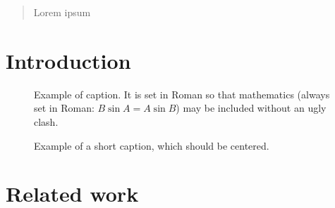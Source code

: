 \documentclass[10pt,twocolumn,letterpaper]{article}
\begin{document}
\title{}

\author{Thomas Steiner\\
Google Germany GmbH\\
ABC Str. 19\\
{\tt\small tomac@google.com}
\and
Ruben Verborgh, Rik Van de Walle \\
Ghent University -- IBBT, ELIS -- Multimedia Lab\\
Gaston Crommenlaan 8 bus 201, B-9050 Ledeberg-Ghent, Belgium\\
{\small \{ruben.verborgh, rik.vandewalle\}@ugent.be}
}

\maketitle

\begin{abstract}
   Lorem ipsum
\end{abstract}

\section{Introduction}



\begin{figure}[t]
\begin{center}
\fbox{\rule{0pt}{2in} \rule{0.9\linewidth}{0pt}}
\end{center}
   \caption{Example of caption.  It is set in Roman so that mathematics
   (always set in Roman: $B \sin A = A \sin B$) may be included without an
   ugly clash.}
\label{fig:long}
\label{fig:onecol}
\end{figure}


\begin{figure*}
\begin{center}
\fbox{\rule{0pt}{2in} \rule{.9\linewidth}{0pt}}
\end{center}
   \caption{Example of a short caption, which should be centered.}
\label{fig:short}
\end{figure*}


\section{Related work}
\end{document}
